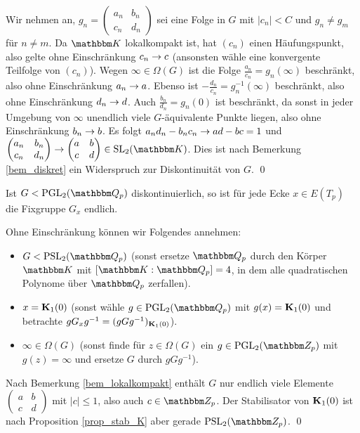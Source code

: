 \documentclass[a4paper, 12pt, twoside]{article}
\begin{document}
\bew Wir nehmen an,
$g_n=\begin{pmatrix}
a_n & b_n \\ c_n & d_n
\end{pmatrix}$ sei eine Folge in $G$ mit $|c_n|<C$ und $g_n\neq g_m$
für $n\neq m$. Da $\KK$ lokalkompakt ist, hat $(c_n)$ einen 
Häufungspunkt, also gelte ohne Einschränkung $c_n\rightarrow c$ (ansonsten
wähle eine konvergente Teilfolge von $(c_n)$).
Wegen $\infty\in\Omega(G)$ ist die Folge $\frac{a_n}{c_n}=g_n(\infty)$
beschränkt, also ohne Einschränkung $a_n\rightarrow a$.
Ebenso ist $-\frac{d_n}{c_n}=g_n^{-1}(\infty)$ beschränkt,
also ohne Einschränkung $d_n\rightarrow d$. Auch $\frac{b_n}{d_n}=g_n(0)$
ist beschränkt, da sonst in jeder Umgebung von $\infty$
unendlich viele $G$-äquivalente Punkte liegen, also
ohne Einschränkung $b_n\rightarrow b$.
Es folgt $a_n d_n - b_n c_n \rightarrow ad-bc=1$ und
$\begin{pmatrix}
a_n & b_n \\ c_n & d_n
\end{pmatrix}\Ra
\begin{pmatrix}
a & b \\ c & d
\end{pmatrix}\in\SL_2(\KK)$.
Dies ist nach Bemerkung \ref{bem_diskret} ein Widerspruch zur
Diskontinuität von $G$.
\qed

\FOLG\label{folg_diskont}
Ist $G<\PGL_2(\QQ_p)$ diskontinuierlich, so ist für jede
Ecke $x\in E(T_p)$ die Fixgruppe $G_x$ endlich.

\bew Ohne Einschränkung können wir Folgendes annehmen:
\begin{itemize}
\item $G<\PSL_2(\QQ_p)$ (sonst ersetze $\QQ_p$ durch den Körper $\KK$
mit $[\KK:\QQ_p]=4$, in dem alle quadratischen Polynome über $\QQ_p$
zerfallen).
\item
$x=\mathbf{K}_1(0)$ (sonst wähle $g\in\PGL_2(\QQ_p)$ mit $g(x)=\mathbf{K}_1(0)$
und betrachte $g G_x g^{-1}=(gGg^{-1})_{\mathbf{K}_1(0)}$).
\item $\infty\in\Omega(G)$ (sonst finde für $z\in\Omega(G)$ ein
$g\in\PGL_2(\ZZ_p)$ mit $g(z)=\infty$ und ersetze $G$ durch
$gGg^{-1}$).
\end{itemize}
Nach Bemerkung \ref{bem_lokalkompakt} enthält $G$ nur endlich viele
Elemente $\begin{pmatrix}
a & b \\ c & d
\end{pmatrix}$ mit $|c|\leq 1$, also auch $c\in\ZZ_p$.
Der Stabilisator von $\mathbf{K}_1(0)$ ist nach Proposition \ref{prop_stab_K}
aber gerade $\PSL_2(\ZZ_p)$.
\qed
\end{document}
